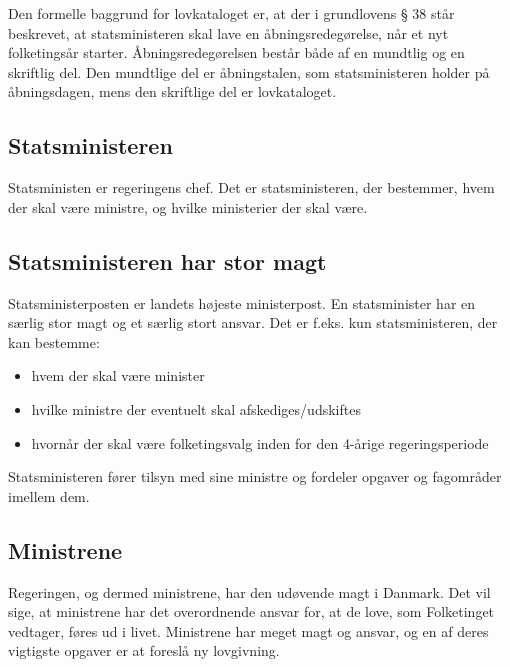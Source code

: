 \documentclass[]{book}
\providecommand{\tightlist}{%
  \setlength{\itemsep}{0pt}\setlength{\parskip}{0pt}}
\begin{document}
Den formelle baggrund for lovkataloget er, at der i grundlovens § 38 står beskrevet, at statsministeren skal lave en åbningsredegørelse, når et nyt folketingsår starter. Åbningsredegørelsen består både af en mundtlig og en skriftlig del. Den mundtlige del er åbningstalen, som statsministeren holder på åbningsdagen, mens den skriftlige del er lovkataloget.

\hypertarget{statsministeren}{%
\subsection{Statsministeren}\label{statsministeren}}

Statsministen er regeringens chef. Det er statsministeren, der bestemmer, hvem der skal være ministre, og hvilke ministerier der skal være.

\hypertarget{statsministeren-har-stor-magt}{%
\subsection{Statsministeren har stor magt}\label{statsministeren-har-stor-magt}}

Statsministerposten er landets højeste ministerpost. En statsminister har en særlig stor magt og et særlig stort ansvar. Det er f.eks. kun statsministeren, der kan bestemme:

\begin{itemize}
\tightlist
\item
  hvem der skal være minister
\item
  hvilke ministre der eventuelt skal afskediges/udskiftes
\item
  hvornår der skal være folketingsvalg inden for den 4-årige regeringsperiode
\end{itemize}

Statsministeren fører tilsyn med sine ministre og fordeler opgaver og fagområder imellem dem.

\hypertarget{ministrene}{%
\subsection{Ministrene}\label{ministrene}}

Regeringen, og dermed ministrene, har den udøvende magt i Danmark. Det vil sige, at ministrene har det overordnende ansvar for, at de love, som Folketinget vedtager, føres ud i livet. Ministrene har meget magt og ansvar, og en af deres vigtigste opgaver er at foreslå ny lovgivning.
\end{document}
